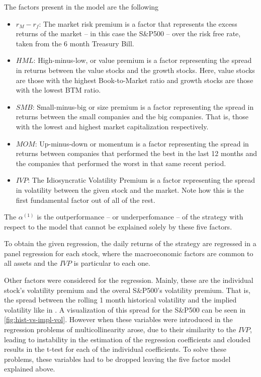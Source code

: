 The factors present in the model are the following 
\begin{itemize}
    \item $r_M-r_f$: The market risk premium is a factor that represents the excess returns of the market -- in this case the S\&P500 -- over the risk free rate, taken from the 6 month Treasury Bill. 
    \item $HML$: High-minus-low, or value premium is a factor representing the spread in returns between the value stocks and the growth stocks. Here, value stocks are those with the highest Book-to-Market ratio and growth stocks are those with the lowest BTM ratio.
    \item $SMB$: Small-minus-big or size premium is a factor representing the spread in returns between the small companies and the big companies. That is, those with the lowest and highest market capitalization respectively.
    \item $MOM$: Up-minus-down or momentum is a factor representing the spread in returns between companies that performed the best in the last 12 months and the companies that performed the worst in that same recent period. 
    \item $IVP$: The Idiosyncratic Volatility Premium is a factor representing the spread in volatility between the given stock and the market. Note how this is the first fundamental factor out of all of the rest.
\end{itemize}

The $\alpha^{(1)}$ is the outperformance -- or underperfomance -- of the strategy with respect to the model that cannot be explained solely by these five factors. 

To obtain the given regression, the daily returns of the strategy are regressed in a panel regression for each stock, where the macroeconomic factors are common to all assets and the $IVP$ is particular to each one. 

Other factors were considered for the regression. Mainly, these are the individual stock's volatility premium and the overal S\&P500's volatility premium. That is, the spread between the rolling 1 month historical volatility and the implied volatility like in \cite{dierckx_2022}. A visualization of this spread for the S\&P500 can be seen in \autoref{fig:hist-vs-impl-vol}. However when these variables were introduced in the regression problems of multicollinearity arose, due to their similarity to the $IVP$, leading to instability in the estimation of the regression coefficients and clouded results in the t-test for each of the individual coefficients. To solve these problems, these variables had to be dropped leaving the five factor model explained above.

